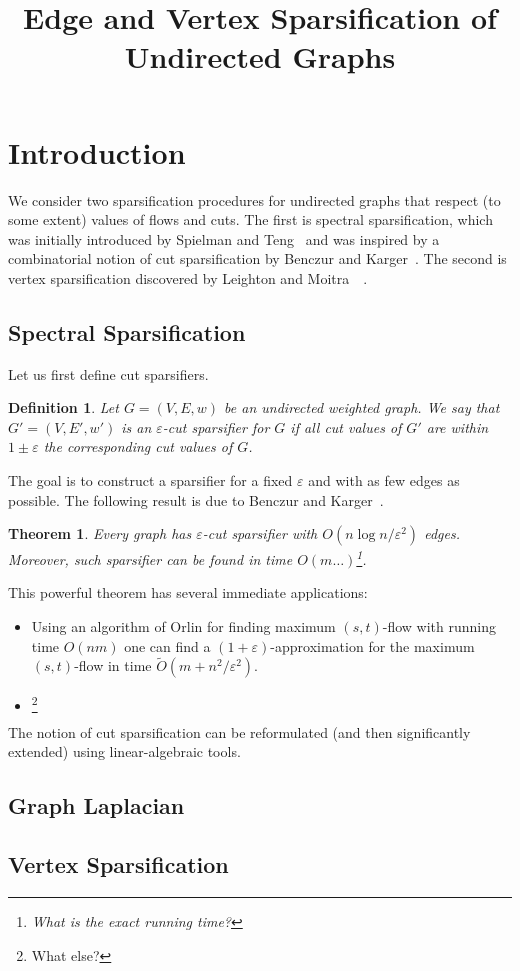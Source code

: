 \documentclass[12pt]{article}
\newcommand{\eps}{\varepsilon}
\newtheorem{theorem}{Theorem}
\newtheorem{definition}{Definition}
\begin{document}
    \title{Edge and Vertex Sparsification of Undirected Graphs}
    \date{}
    \maketitle

    \section{Introduction}
    We consider two sparsification procedures for undirected graphs that respect (to some extent) values of
    flows and cuts. The first is spectral sparsification, which was initially introduced by Spielman and Teng~\cite{} and was
    inspired by a combinatorial notion of cut sparsification by Benczur and Karger~\cite{}.
    The second is vertex sparsification discovered by Leighton and Moitra~\cite{}~\cite{}.
    \subsection{Spectral Sparsification}
    Let us first define cut sparsifiers.
    \begin{definition}
        Let $G = (V, E, w)$ be an undirected weighted graph.
        We say that $G' = (V, E', w')$ is an $\eps$-cut sparsifier for $G$ if all cut values of $G'$ are within
        $1 \pm \eps$ the corresponding cut values of $G$.
    \end{definition}
    The goal is to construct a sparsifier for a fixed $\eps$ and with as few edges as possible.
    The following result is due to Benczur and Karger~\cite{}.
    \begin{theorem}
        Every graph has $\eps$-cut sparsifier with $O(n \log n / \eps^2)$ edges.
        Moreover, such sparsifier can be found in time $O(m \ldots)$\footnote{What is the exact running time?}.
    \end{theorem}
    This powerful theorem has several immediate applications:
    \begin{itemize}
        \item Using an algorithm of Orlin for finding maximum $(s,t)$-flow with running time $O(nm)$ one can find a
        $(1 + \eps)$-approximation for the maximum $(s, t)$-flow in time $\tilde{O}(m + n^2 / \eps^2)$.
        \item\footnote{What else?}
    \end{itemize}
    The notion of cut sparsification can be reformulated (and then significantly extended) using linear-algebraic tools.
    \subsection{Graph Laplacian}
    \subsection{Vertex Sparsification}
\end{document}
